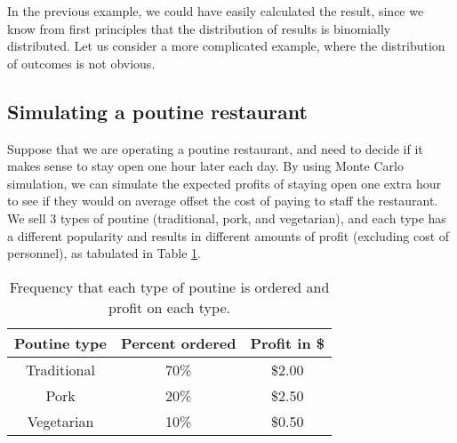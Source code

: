 In the previous example, we could have easily calculated the result, since we know from first principles that the distribution of results is binomially distributed. Let us consider a more complicated example, where the distribution of outcomes is not obvious.

\subsection{Simulating a poutine restaurant}
Suppose that we are operating a poutine restaurant, and need to decide if it makes sense to stay open one hour later each day. By using Monte Carlo simulation, we can simulate the expected profits of staying open one extra hour to see if they would on average offset the cost of paying to staff the restaurant. We sell 3 types of poutine (traditional, pork, and vegetarian), and each type has a different popularity and results in different amounts of profit (excluding cost of personnel), as tabulated in Table \ref{tab:poutineProfits}.
\begin{table}[h!]
\center
\begin{tabular}{|c|c|c|}
\hline
\textbf{Poutine type} & \textbf{Percent ordered} & \textbf{Profit in \$}\\
\hline
Traditional & 70\% & \$2.00\\
Pork & 20\% & \$2.50\\
Vegetarian & 10\% & \$0.50\\
\hline
\end{tabular}
\caption{\label{tab:poutineProfits} Frequency that each type of poutine is ordered and profit on each type.}
\end{table}

